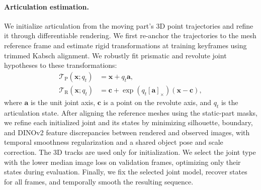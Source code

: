 \paragraph{Articulation estimation.}
We initialize articulation from the moving part's 3D point trajectories
and refine it through differentiable rendering. We first re-anchor the
trajectories to the mesh reference frame and estimate rigid transformations
at training keyframes using trimmed Kabsch alignment. We robustly fit
prismatic and revolute joint hypotheses to these transformations:
\begin{align}
    \mathcal{T}_{\mathrm{P}}(\mathbf{x};q_t)
    &= \mathbf{x}+q_t\mathbf{a}, \\
    \mathcal{T}_{\mathrm{R}}(\mathbf{x};q_t)
    &= \mathbf{c}+\exp\!\left(q_t[\mathbf{a}]_\times\right)
       (\mathbf{x}-\mathbf{c}),
\end{align}
where $\mathbf{a}$ is the unit joint axis, $\mathbf{c}$ is a point on
the revolute axis, and $q_t$ is the articulation state. After aligning
the reference meshes using the static-part masks, we refine each
initialized joint and its states by minimizing silhouette, boundary,
and DINOv2 feature discrepancies between rendered and observed images,
with temporal smoothness regularization and a shared object pose and
scale correction. The 3D tracks are used only for initialization.
We select the joint type with the lower median image loss on validation
frames, optimizing only their states during evaluation. Finally, we fix
the selected joint model, recover states for all frames, and temporally
smooth the resulting sequence.
